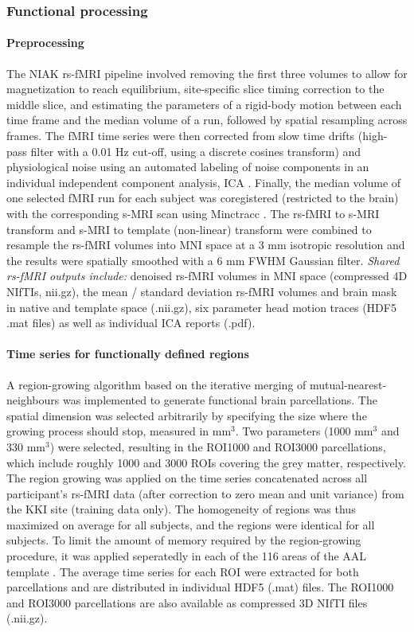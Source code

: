 \documentclass[preprint,12pt,3p]{elsarticle}
\begin{document}
\subsubsection{Functional processing} 

\paragraph{Preprocessing} The NIAK rs-fMRI pipeline involved removing the first three volumes to allow for magnetization to reach equilibrium, site-specific slice timing correction to the middle slice, and estimating the parameters of a rigid-body motion between each time frame and the median volume of a run, followed by spatial resampling across frames. The fMRI time series were then corrected from slow time drifts (high-pass filter with a 0.01 Hz cut-off, using a discrete cosines transform) and physiological noise using an automated labeling of noise components in an individual independent component analysis, ICA \citep{perlbarg2007corsica}. Finally, the median volume of one selected fMRI run for each subject was coregistered (restricted to the brain) with the corresponding s-MRI scan using Minctracc \cite{collins1994automatic}. The rs-fMRI to s-MRI transform and s-MRI to template (non-linear) transform were combined to resample the rs-fMRI volumes into MNI space at a 3 mm isotropic resolution and the results were spatially smoothed with a 6 mm FWHM Gaussian filter. \emph{Shared rs-fMRI outputs include:} denoised rs-fMRI volumes in MNI space (compressed 4D NIfTIs, nii.gz), the mean / standard deviation rs-fMRI volumes and brain mask in native and template space (.nii.gz), six parameter head motion traces (HDF5 .mat files) as well as individual ICA reports (.pdf).   

\paragraph{Time series for functionally defined regions} A region-growing algorithm \citep{bellec2006identification} based on the iterative merging of mutual-nearest-neighbours was implemented to generate functional brain parcellations. The spatial dimension was selected arbitrarily by specifying the size where the growing process should stop, measured in mm$^3$. Two parameters (1000 mm$^3$ and 330 mm$^3$) were selected, resulting in the ROI1000 and ROI3000 parcellations, which include roughly 1000 and 3000 ROIs covering the grey matter, respectively. The region growing was applied on the time series concatenated across all participant's rs-fMRI data (after correction to zero mean and unit variance) from the KKI site (training data only). The homogeneity of regions was thus maximized on average for all subjects, and the regions were identical for all subjects. To limit the amount of memory required by the region-growing procedure, it was applied seperatedly in each of the 116 areas of the AAL template \citep{tzourio2002automated}. The average time series for each ROI were extracted for both parcellations and are distributed in individual HDF5 (.mat) files. The ROI1000 and ROI3000 parcellations are also available as compressed 3D NIfTI files (.nii.gz).
\end{document}
